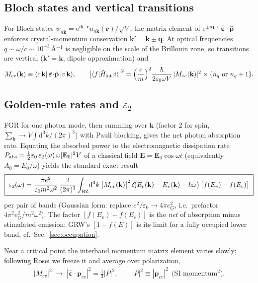 \documentclass[11pt,a4paper]{article}
\numberwithin{equation}{section}
\newcommand{\hw}{\hbar\omega}
\newcommand{\pcv}{\mathbf{p}_{cv}}
\newcommand{\eps}{\varepsilon}
\newcommand{\epsz}{\varepsilon_0}
\newcommand{\dd}{\mathrm{d}}
\newcommand{\Ec}{E_c}
\newcommand{\Ev}{E_v}
\newcommand{\fFD}{f}
\newcommand{\rme}{\mathrm{e}}
\begin{document}
\subsection{Bloch states and vertical transitions}

For Bloch states $\psi_{n\mathbf k}=\rme^{i\mathbf k\cdot\mathbf r}
u_{n\mathbf k}(\mathbf r)/\sqrt V$, the matrix element of
$\rme^{\pm i\mathbf q\cdot\mathbf r}\,\hat{\bm\eps}\!\cdot\!\hat{\mathbf p}$
enforces crystal-momentum conservation
$\mathbf k'=\mathbf k\pm\mathbf q$.  At optical frequencies
$q\sim\omega/c\sim10^{-3}\,$\AA$^{-1}$ is negligible on the scale of
the Brillouin zone, so transitions are vertical
($\mathbf k'=\mathbf k$, dipole approximation) and
\begin{equation}
M_{cv}(\mathbf k)\equiv
\langle c\,\mathbf k|\,\hat{\bm\eps}\!\cdot\!\hat{\mathbf p}\,|v\,\mathbf k\rangle,
\qquad
\bigl|\langle f|\hat H_{\rm int}|i\rangle\bigr|^2
=\Bigl(\frac{e}{m}\Bigr)^{2}\frac{\hbar}{2\epsz\omega V}\,
 |M_{cv}(\mathbf k)|^{2}\times\{n_q\text{ or }n_q+1\}.
\label{eq:MEsq}
\end{equation}

\subsection{Golden-rule rates and $\eps_2$}\label{sec:eps2def}

FGR for one photon mode, then summing over $\mathbf k$ (factor 2 for
spin, $\sum_{\mathbf k}\to V\!\int\!\dd^3k/(2\pi)^3$) with Pauli
blocking, gives the net photon absorption rate.  Equating the absorbed
power to the electromagnetic dissipation rate
$P_{\rm abs}=\tfrac12\epsz\,\eps_2(\omega)\,\omega|\mathbf E_0|^2 V$
of a classical field $\mathbf E=\mathbf E_0\cos\omega t$
(equivalently $A_0=E_0/\omega$) yields the standard exact result
\begin{equation}
\boxed{\;
\eps_2(\omega)=\frac{\pi e^2}{\epsz m^2\omega^2}\,
\frac{2}{(2\pi)^3}\int_{\rm BZ}\!\dd^3k\;
\bigl|M_{cv}(\mathbf k)\bigr|^{2}\,
\delta\!\bigl(\Ec(\mathbf k)-\Ev(\mathbf k)-\hw\bigr)\,
\bigl[\fFD(\Ev)-\fFD(\Ec)\bigr]\; }
\label{eq:eps2exact}
\end{equation}
per pair of bands (Gaussian form: replace $e^2/\epsz\to4\pi e_G^2$,
i.e.\ prefactor $4\pi^2e_G^2/m^2\omega^2$).  The factor
$[\fFD(\Ev)-\fFD(\Ec)]$ is the \emph{net} of absorption minus
stimulated emission; GRW's $[1-\fFD(E)]$ is its limit for a fully
occupied lower band, cf.\ Sec.~\ref{sec:occupation}.

Near a critical point the interband momentum matrix element varies
slowly; following Rosei we freeze it and average over polarization,
\begin{equation}
|M_{cv}|^2\;\longrightarrow\;
\overline{|\hat{\bm\eps}\!\cdot\!\pcv|^2}=\tfrac13|P|^2,
\qquad |P|^2\equiv|\pcv|^2\ \ \text{(SI momentum$^2$)} .
\label{eq:Pdef}
\end{equation}
\end{document}
